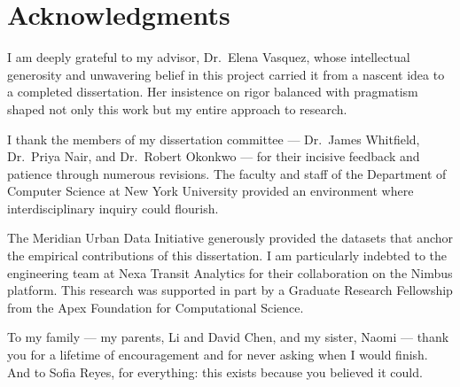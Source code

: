 \chapter*{Acknowledgments}
\thispagestyle{plain}

\singlespacing
I am deeply grateful to my advisor, Dr.\ Elena Vasquez, whose intellectual generosity and unwavering belief in this project carried it from a nascent idea to a completed dissertation. Her insistence on rigor balanced with pragmatism shaped not only this work but my entire approach to research.

I thank the members of my dissertation committee --- Dr.\ James Whitfield, Dr.\ Priya Nair, and Dr.\ Robert Okonkwo --- for their incisive feedback and patience through numerous revisions. The faculty and staff of the Department of Computer Science at New York University provided an environment where interdisciplinary inquiry could flourish.

The Meridian Urban Data Initiative generously provided the datasets that anchor the empirical contributions of this dissertation. I am particularly indebted to the engineering team at Nexa Transit Analytics for their collaboration on the Nimbus platform. This research was supported in part by a Graduate Research Fellowship from the Apex Foundation for Computational Science.

To my family --- my parents, Li and David Chen, and my sister, Naomi --- thank you for a lifetime of encouragement and for never asking when I would finish. And to Sofia Reyes, for everything: this exists because you believed it could.

\doublespacing
